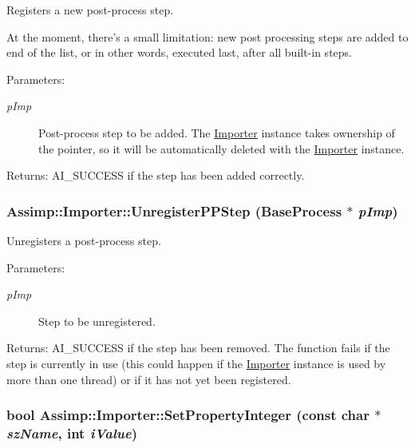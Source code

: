 Registers a new post-process step.

At the moment, there's a small limitation: new post processing steps are added to end of the list, or in other words, executed last, after all built-in steps. \begin{Desc}
\item[Parameters:]
\begin{description}
\item[{\em pImp}]Post-process step to be added. The \hyperlink{class_assimp_1_1_importer}{Importer} instance takes ownership of the pointer, so it will be automatically deleted with the \hyperlink{class_assimp_1_1_importer}{Importer} instance. \end{description}
\end{Desc}
\begin{Desc}
\item[Returns:]AI\_\-SUCCESS if the step has been added correctly. \end{Desc}
\hypertarget{class_assimp_1_1_importer_3a683671c7c40638b1103c5d3648d86c}{
\subsubsection[UnregisterPPStep]{ Assimp::Importer::UnregisterPPStep (BaseProcess $\ast$ {\em pImp})}}
\label{class_assimp_1_1_importer_3a683671c7c40638b1103c5d3648d86c}


Unregisters a post-process step.

\begin{Desc}
\item[Parameters:]
\begin{description}
\item[{\em pImp}]Step to be unregistered. \end{description}
\end{Desc}
\begin{Desc}
\item[Returns:]AI\_\-SUCCESS if the step has been removed. The function fails if the step is currently in use (this could happen if the \hyperlink{class_assimp_1_1_importer_2c207299ed05f1db1ad1e6dab005f719}{Importer} instance is used by more than one thread) or if it has not yet been registered. \end{Desc}
\hypertarget{class_assimp_1_1_importer_2542eed3d5f491025c4095b4e55fa068}{
\subsubsection[SetPropertyInteger]{\setlength{\rightskip}{0pt plus 5cm}bool Assimp::Importer::SetPropertyInteger (const char $\ast$ {\em szName}, \/  int {\em iValue})}}
\label{class_assimp_1_1_importer_2542eed3d5f491025c4095b4e55fa068}


